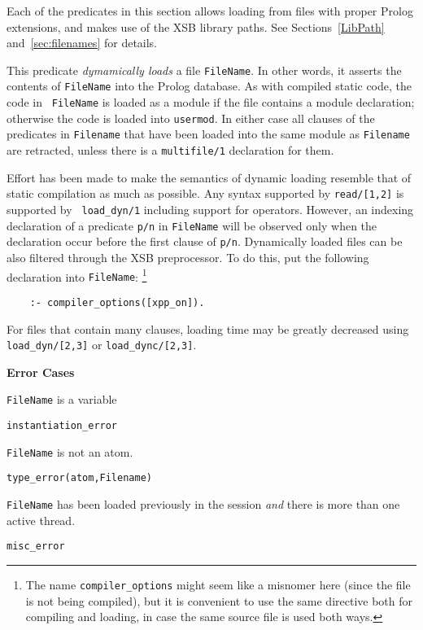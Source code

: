 Each of the predicates in this section allows loading from files with
proper Prolog extensions, and makes use of the XSB library paths.  See
Sections~\ref{LibPath} and~\ref{sec:filenames} for details.

\begin{description}
\label{load_dyn/1}
    This predicate {\em dymamically loads} a file {\tt FileName}.  In
    other words, it asserts the contents of {\tt FileName} into the
    Prolog database.  As with compiled static code, the code in {\tt
      FileName} is loaded as a module if the file contains a module
    declaration; otherwise the code is loaded into {\tt usermod}.  In
    either case all clauses of the predicates in {\tt Filename} that
    have been loaded into the same module as {\tt Filename} are
    retracted, unless there is a {\tt multifile/1} declaration for
    them.

    Effort has been made to make the semantics of dynamic loading
    resemble that of static compilation as much as possible.  Any
    syntax supported by {\tt read/[1,2]} is supported by {\tt
      load\_dyn/1} including support for operators.  However, an
    indexing declaration of a predicate {\tt p/n} in {\tt FileName}
    will be observed only when the declaration occur before the first
    clause of {\tt p/n}.  Dynamically loaded files can be also
    filtered through the XSB preprocessor.  To do this, put the
    following declaration into {\tt FileName}:
    \footnote{The name {\tt compiler\_options} might seem like a misnomer
    here (since the file is not being compiled), but it is convenient to
    use the same directive both for compiling and loading, in case the same
    source file is used both ways.}
    \begin{verbatim}
    :- compiler_options([xpp_on]).      
    \end{verbatim}

    For files that contain many clauses, loading time may be greatly
    decreased using {\tt load\_dyn/[2,3]} or {\tt load\_dync/[2,3]}.

{\bf Error Cases}
\bi
\item 	{\tt FileName} is a variable
 \bi
 \item 	{\tt instantiation\_error}
 \ei
\item 	{\tt FileName} is not an atom.
 \bi
 \item 	{\tt type\_error(atom,Filename)}
 \ei
\item {\tt FileName} has been loaded previously in the session {\em and}
  there is more than one active thread.  
 \bi
 \item 	{\tt misc\_error}
 \ei
%
\ei


\end{description}
